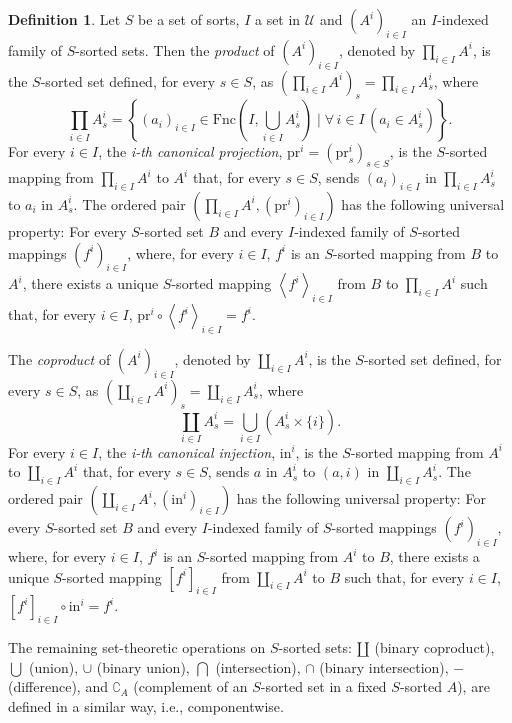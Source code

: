 \documentclass[a4paper, reqno
]{amsart}
\theoremstyle{plain}
\theoremstyle{definition}
\newtheorem{definition}[theorem]{Definition}
\begin{document}
\begin{definition}\label{DSortedProd}
Let $S$ be a set of sorts, $I$ a set in $\boldsymbol{\mathcal{U}}$ and $(A^{i})_{i\in I}$ an $I$-indexed family of $S$-sorted sets.
Then the \emph{product} of $(A^{i})_{i\in I}$, denoted by $\prod_{i\in I}A^{i}$, is the $S$-sorted set defined, for every $s\in S$, as $\left(\prod\nolimits_{i\in I}A^{i}\right)_{s} = \prod\nolimits_{i\in I}A^{i}_{s}$, where
$$
\textstyle
\prod_{i\in I}A^{i}_{s} = \left\{(a_{i})_{i\in I}\in\mathrm{Fnc}\left(I,\bigcup_{i\in I}A^{i}_{s}\right)\mid \forall\,i\in I\,\left(a_{i}\in A^{i}_{s}\right)\right\}.
$$
For every $i\in I$, the \emph{i-th canonical projection}, $\mathrm{pr}^{i} = (\mathrm{pr}^{i}_{s})_{s\in S}$, is the $S$-sorted mapping from $\prod_{i\in I}A^{i}$ to $A^{i}$ that, for every $s\in S$, sends $(a_{i})_{i\in I}$ in $\prod_{i\in I}A^{i}_{s}$ to $a_{i}$ in $A^{i}_{s}$.
The ordered pair $(\prod_{i\in I}A^{i},(\mathrm{pr}^{i})_{i\in I})$ has the following universal property: For every $S$-sorted set $B$ and every $I$-indexed family of $S$-sorted mappings $(f^{i})_{i\in I}$, where, for every $i\in I$, $f^{i}$ is an $S$-sorted mapping from $B$ to $A^{i}$, there exists a unique $S$-sorted mapping $\left<f^{i}\right>_{i\in I}$ from $B$ to $\prod_{i\in I}A^{i}$ such that, for every $i\in I$, $\mathrm{pr}^{i}\circ \left<f^{i}\right>_{i\in I} = f^{i}$.

The \emph{coproduct} of $(A^{i})_{i\in I}$, denoted by $\coprod_{i\in I}A^{i}$, is the $S$-sorted set defined, for every $s\in S$, as $\left(\coprod\nolimits_{i\in I}A^{i}\right)_{s} = \coprod\nolimits_{i\in I}A^{i}_{s}$, where
$$
\textstyle
\coprod_{i\in I}A^{i}_{s} = \bigcup_{i\in I}(A^{i}_{s}\times\{i\}).
$$
For every $i\in I$, the \emph{i-th canonical injection}, $\mathrm{in}^{i}$, is the $S$-sorted mapping from $A^{i}$ to $\coprod_{i\in I}A^{i}$ that, for every $s\in S$, sends $a$ in $A^{i}_{s}$ to $(a,i)$ in $\coprod_{i\in I}A^{i}_{s}$.
The ordered pair $(\coprod_{i\in I}A^{i},(\mathrm{in}^{i})_{i\in I})$ has the following universal property: For every $S$-sorted set $B$ and every $I$-indexed family of $S$-sorted mappings $(f^{i})_{i\in I}$, where, for every $i\in I$, $f^{i}$ is an $S$-sorted mapping from $A^{i}$ to $B$, there exists a unique $S$-sorted mapping $[f^{i}]_{i\in I}$ from $\coprod_{i\in I}A^{i}$ to $B$ such that, for every $i\in I$, $ [f^{i}]_{i\in I}\circ\mathrm{in}^{i} = f^{i}$.

The remaining set-theoretic operations on $S$-sorted sets: $\amalg$ (binary coproduct), $\bigcup$ (union), $\cup$ (binary union), $\bigcap$ (intersection), $\cap$ (binary intersection), $-$ (difference), and $\complement_{A}$ (complement of an $S$-sorted set in a fixed $S$-sorted $A$), are defined in a similar way, i.e., componentwise.
\end{definition}
\end{document}
